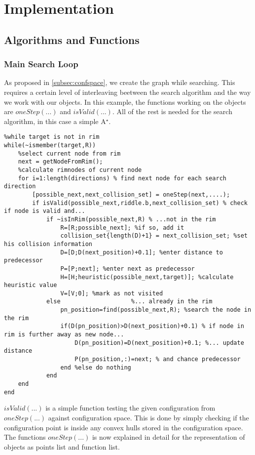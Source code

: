 \chapter{Implementation}
\label{cha:Implementation}

\section{Algorithms and Functions}
\subsection{Main Search Loop}
As proposed in \ref{subsec:confspace}, we create the graph while searching. This requires a certain level of interleaving beetween the search algorithm and the way we work with our objects. In this example, the functions working on the objects are $oneStep(...)$ and $isValid(...)$. All of the rest is needed for the search algorithm, in this case a simple A$^\star$.

\begin{lstlisting}
%while target is not in rim
while(~ismember(target,R))
    %select current node from rim
    next = getNodeFromRim();  
    %calculate rimnodes of current node 
    for i=1:length(directions) % find next node for each search direction
        [possible_next,next_collision_set] = oneStep(next,....); 
        if isValid(possible_next,riddle.b,next_collision_set) % check if node is valid and...
            if ~isInRim(possible_next,R) % ...not in the rim
                R=[R;possible_next]; %if so, add it
                collision_set{length(D)+1} = next_collision_set; %set his collision information
                D=[D;D(next_position)+0.1]; %enter distance to predecessor
                P=[P;next]; %enter next as predecessor
                H=[H;heuristic(possible_next,target)]; %calculate heuristic value
                V=[V;0]; %mark as not visited
            else                    %... already in the rim
                pn_position=find(possible_next,R); %search the node in the rim
                if(D(pn_position)>D(next_position)+0.1) % if node in rim is further away as new node...
                    D(pn_position)=D(next_position)+0.1; %... update distance
                    P(pn_position,:)=next; % and chance predecessor
                end %else do nothing
            end
    end  
end
\end{lstlisting}

$isValid(...)$ is a simple function testing the given configuration from $oneStep(...)$ against configuration space. This is done by simply checking if the configuration point is inside any convex hulls stored in the configuration space.\\
The functions $oneStep(...)$ is now explained in detail for the representation of objects as points list and function list.
